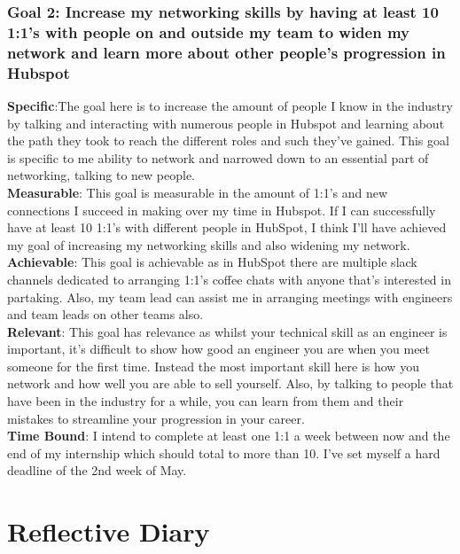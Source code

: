 \documentclass[12pt]{article} %
\begin{document}
\subsubsection{Goal 2: Increase my networking skills by having at least 10 1:1's with people on and outside my team to widen my network and learn more about other people's progression in Hubspot}
\textbf{Specific}:The goal here is to increase the amount of people I know in the industry by talking and interacting with numerous people in Hubspot and learning about the path they took to reach the different roles and such they've gained. This goal is specific to me ability to network and narrowed down to an essential part of networking,  talking to new people. 
\\ \textbf{Measurable}: This goal is measurable in the amount of 1:1's and new connections I succeed in making over my time in Hubspot.  If I can successfully have at least 10 1:1's with different people in HubSpot,  I think I'll have achieved my goal of increasing my networking skills and also widening my network.
\\ \textbf{Achievable}: This goal is achievable as in HubSpot there are multiple slack channels dedicated to arranging 1:1's coffee chats with anyone that's interested in partaking.  Also,  my team lead can assist me in arranging meetings with engineers and team leads on other teams also.
\\ \textbf{Relevant}: This goal has relevance as whilst your technical skill as an engineer is important,  it's difficult to show how good an engineer you are when you meet someone for the first time.  Instead the most important skill here is how you network and how well you are able to sell yourself.  Also, by talking to people that have been in the industry for a while,  you can learn from them and their mistakes to streamline your progression in your career. 
\\ \textbf{Time Bound}: I intend to complete at least one 1:1  a week between now and the end of my internship which should total to more than 10.  I've set myself a hard deadline of the 2nd week of May. 
\newpage
\section{Reflective Diary}
\end{document}
